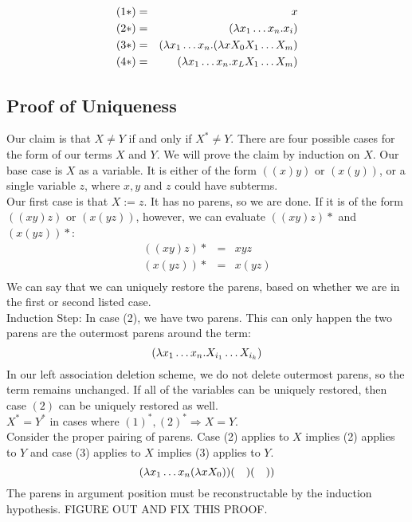 \begin{eqnarray*}
  (1*) &=& x\\
  (2*) &=& (\lambda x_1\ldots x_n.x_i)\\
  (3*) &=& (\lambda x_1 \ldots x_n . (\lambda xX_0X_1 \ldots X_m)\\
  (4*) &=& (\lambda x_1 \ldots x_n . x_LX_1 \ldots X_m)\\
\end{eqnarray*}

\subsection{Proof of Uniqueness}
Our claim is that $X \not= Y$ if and only if $X^* \not= Y$. There are four possible cases for the form of our terms $X$ and $Y$. We will prove the claim by induction on $X$. Our base case is $X$ as a variable. It is either of the form $((x)y)$ or $(x(y))$, or a single variable $z$, where $x, y$ and $z$ could have subterms.\\

Our first case is that $X := z$. It has no parens, so we are done. If it is of the form $((xy)z)$ or $(x(yz))$, however, we can evaluate $((xy)z)*$ and $(x(yz))*$:
\begin{eqnarray*}
  ((xy)z)* &=& xyz\\
  (x(yz))* &=& x(yz)\\
\end{eqnarray*}
We can say that we can uniquely restore the parens, based on whether we are in the first or second listed case.\\

Induction Step: In case (2), we have two parens. This can only happen the two parens are the outermost parens around the term:
\begin{equation*}
  (\lambda x_1 \ldots x_n.X_{i_1}\ldots X_{i_k})
\end{equation*}
In our left association deletion scheme, we do not delete outermost parens, so the term remains unchanged. If all of the variables can be uniquely restored, then case $(2)$ can be uniquely restored as well.\\

$X^* = Y^*$ in cases where $(1)^*, (2)^* \Rightarrow X = Y$.\\

Consider the proper pairing of parens. Case (2) applies to $X$ implies (2) applies to $Y$ and case (3) applies to $X$ implies (3) applies to $Y$.
\begin{equation*}
  (\l x_1 \ldots x_n (\l xX_0))(\ \ \ )(\ \ \ ))
\end{equation*}
The parens in argument position must be reconstructable by the induction hypothesis. FIGURE OUT AND FIX THIS PROOF.

